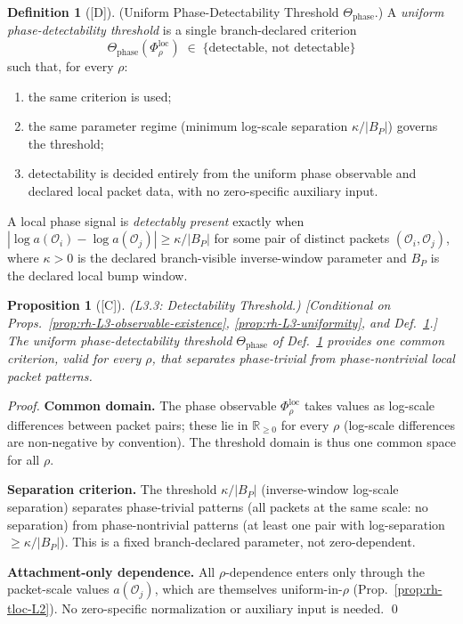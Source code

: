 \documentclass[12pt,oneside]{amsbook}
\theoremstyle{plain}
\newtheorem{proposition}[theorem]{Proposition}
\theoremstyle{definition}
\newtheorem{definition}[theorem]{Definition}
\theoremstyle{remark}
\newcommand{\status}[1]{\textup{[#1]}}
\begin{document}
\begin{definition}[\status{D}]\label{def:rh-phase-threshold}
\textup{(Uniform Phase-Detectability Threshold $\Theta_{\mathrm{phase}}$.)}
A \emph{uniform phase-detectability threshold} is a single
branch-declared criterion
\[
 \Theta_{\mathrm{phase}}(\Phi_\rho^{\mathrm{loc}})
 \;\in\; \{\text{detectable},\,\text{not detectable}\}
\]
such that, for every $\rho$:
\begin{enumerate}[label=\textup{(\arabic*)}]
 \item the same criterion is used;
 \item the same parameter regime (minimum log-scale separation
 $\kappa/|B_P|$) governs the threshold;
 \item detectability is decided entirely from the uniform phase
 observable and declared local packet data, with no zero-specific
 auxiliary input.
\end{enumerate}
A local phase signal is \emph{detectably present} exactly when
$|\log a(\mathcal{O}_i) - \log a(\mathcal{O}_j)| \geq \kappa/|B_P|$
for some pair of distinct packets $(\mathcal{O}_i, \mathcal{O}_j)$,
where $\kappa > 0$ is the declared branch-visible inverse-window
parameter and $B_P$ is the declared local bump window.
\end{definition}

\begin{proposition}[\status{C}]\label{prop:rh-L3-threshold}
\textup{(L3.3: Detectability Threshold.)}
\textup{[Conditional on Props.~\ref{prop:rh-L3-observable-existence},
\ref{prop:rh-L3-uniformity}, and Def.~\ref{def:rh-phase-threshold}.]}
The uniform phase-detectability threshold
$\Theta_{\mathrm{phase}}$ of Def.~\ref{def:rh-phase-threshold}
provides one common criterion, valid for every $\rho$, that
separates phase-trivial from phase-nontrivial local packet patterns.
\end{proposition}

\begin{proof}
\textbf{Common domain.} The phase observable
$\Phi_\rho^{\mathrm{loc}}$ takes values as log-scale differences
between packet pairs; these lie in $\mathbb{R}_{\geq 0}$ for every
$\rho$ (log-scale differences are non-negative by convention). The
threshold domain is thus one common space for all $\rho$.

\textbf{Separation criterion.} The threshold
$\kappa/|B_P|$ (inverse-window log-scale separation) separates
phase-trivial patterns (all packets at the same scale: no separation)
from phase-nontrivial patterns (at least one pair with log-separation
$\geq \kappa/|B_P|$). This is a fixed branch-declared parameter,
not zero-dependent.

\textbf{Attachment-only dependence.} All $\rho$-dependence enters
only through the packet-scale values $a(\mathcal{O}_j)$, which are
themselves uniform-in-$\rho$ (Prop.~\ref{prop:rh-tloc-L2}). No
zero-specific normalization or auxiliary input is needed. \qed
\end{proof}
\end{document}
